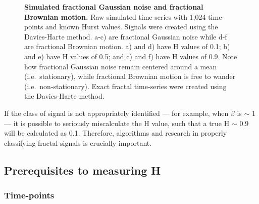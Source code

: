 \documentclass[
  sn-vancouver,
  Numbered,
  referee,
  lineno]{sn-jnl}
\begin{document}
\begin{figure}[H]


\caption{\label{fig-typicalsamplepaths}\textbf{Simulated fractional
Gaussian noise and fractional Brownian motion.} Raw simulated
time-series with 1,024 time-points and known Hurst values. Signals were
created using the Davies-Harte method. a-c) are fractional Gaussian
noise while d-f are fractional Brownian motion. a) and d) have H values
of 0.1; b) and e) have H values of 0.5; and c) and f) have H values of
0.9. Note how fractional Gaussian noise remain centered around a mean
(i.e.~stationary), while fractional Brownian motion is free to wander
(i.e.~non-stationary). Exact fractal time-series were created using the
Davies-Harte method.}

\end{figure}%

If the class of signal is not appropriately identified --- for example,
when \(\beta\) is \(\sim\) 1 --- it is possible to seriously
miscalculate the H value, such that a true H \(\sim\) 0.9 will be
calculated as 0.1. Therefore, algorithms and research in properly
classifying fractal signals is crucially important.

\subsection{Prerequisites to measuring
H}\label{prerequisites-to-measuring-h-1}

\subsubsection{Time-points}\label{time-points-1}
\end{document}
